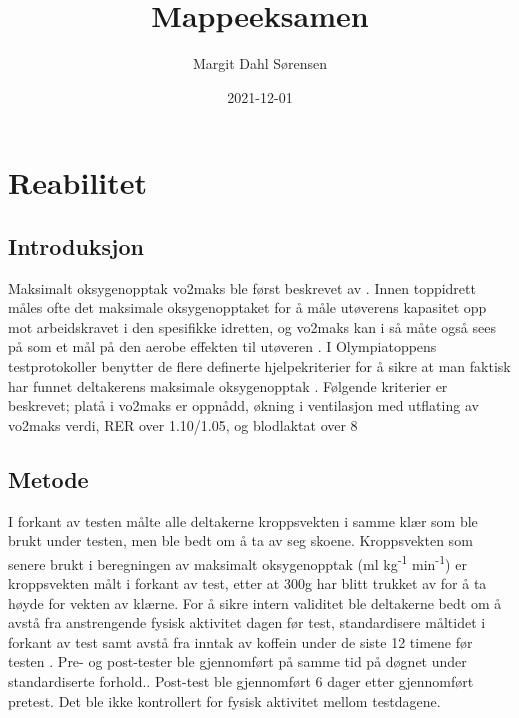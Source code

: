 \documentclass[
]{book}
\title{Mappeeksamen}
\author{Margit Dahl Sørensen}
\date{2021-12-01}
\begin{document}
\maketitle

{
\setcounter{tocdepth}{1}
\tableofcontents
}
\hypertarget{reabilitet}{%
\chapter{Reabilitet}\label{reabilitet}}

\hypertarget{introduksjon}{%
\section{Introduksjon}\label{introduksjon}}

Maksimalt oksygenopptak vo2maks ble først beskrevet av \citetext{\citealp[, og
kan defineres som kroppens evne til å ta opp og forbruke oksygen per
tidsenhet {[}\citet{hill1923}]{hill1923}; \citealp{Basset2000}}. Innen toppidrett måles ofte det
maksimale oksygenopptaket for å måle utøverens kapasitet opp mot
arbeidskravet i den spesifikke idretten, og vo2maks kan i så måte også
sees på som et mål på den aerobe effekten til utøveren \citep{bassett2000}. I
Olympiatoppens testprotokoller benytter de flere definerte
hjelpekriterier for å sikre at man faktisk har funnet deltakerens
maksimale oksygenopptak \citep{tønnessen2017}. Følgende kriterier er
beskrevet; platå i vo2maks er oppnådd, økning i ventilasjon med
utflating av vo2maks verdi, RER over 1.10/1.05,
og blodlaktat over 8 \citep{tønnessen2017}

\hypertarget{metode}{%
\section{Metode}\label{metode}}

I forkant av testen målte alle deltakerne kroppsvekten i samme klær som
ble brukt under testen, men ble bedt om å ta av seg skoene. Kroppsvekten
som senere brukt i beregningen av maksimalt oksygenopptak (ml kg\textsuperscript{-1}
min\textsuperscript{-1}) er kroppsvekten målt i forkant av test, etter at 300g har blitt
trukket av for å ta høyde for vekten av klærne. For å sikre intern
validitet ble deltakerne bedt om å avstå fra anstrengende fysisk
aktivitet dagen før test, standardisere måltidet i forkant av test samt
avstå fra inntak av koffein under de siste 12 timene før testen
\citep{halperin2015}. Pre- og post-tester ble gjennomført på samme tid på
døgnet under standardiserte forhold.. Post-test ble gjennomført 6 dager
etter gjennomført
pretest.
Det ble ikke kontrollert for fysisk aktivitet mellom testdagene.
\end{document}
